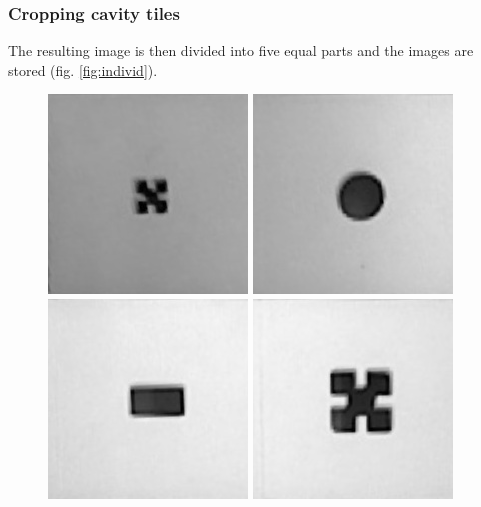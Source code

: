 \documentclass{article}
\begin{document}
\subsubsection*{Cropping cavity tiles}

The resulting image is then divided into five equal parts and the images are stored (fig. \ref{fig:individ}).\\
\begin{figure}[h!]
\begin{minipage}{\textwidth}
\centering
\includegraphics[scale=0.3]{images/tile0.jpg}
\hspace{0.1cm}
\includegraphics[scale=0.3]{images/tile1.jpg}
\hspace{0.1cm}
\includegraphics[scale=0.3]{images/tile2.jpg}
\hspace{0.1cm}
\includegraphics[scale=0.3]{images/tile3.jpg}

\end{minipage}
\end{figure}
\end{document}
